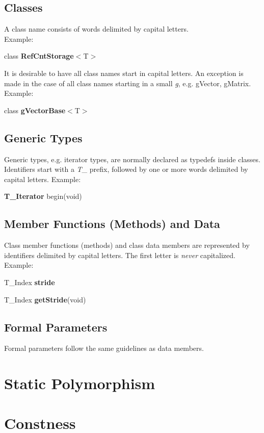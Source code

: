\documentclass[12pt,a4paper]{book}
\begin{document}
\subsection{Classes}
A class name consists of words delimited by capital letters. \\
Example:
\begin{center} 
    class \textbf{RefCntStorage}$<$T$>$ 
\end{center}
It is desirable to have all class names start in capital letters. An
exception is made in the case of all class names starting in a small {\emph
  g}, e.g. gVector, gMatrix. \\
Example:
\begin{center} 
    class \textbf{gVectorBase}$<$T$>$ 
\end{center}

\subsection{Generic Types}
Generic types, e.g. iterator types, are normally declared as typedefs inside classes.
Identifiers start with a {\emph T\_} prefix, followed by one or more words
delimited by capital letters.
Example:
\begin{center} 
    \textbf{T\_Iterator} begin(void) 
\end{center}

\subsection{Member Functions (Methods) and Data}
Class member functions (methods) and class data members are represented by identifiers delimited by
capital letters. The first letter is \emph{never} capitalized. \\
Example:
\begin{center} 
    T\_Index \textbf{stride} 
\end{center}
\begin{center} 
    T\_Index \textbf{getStride}(void) 
\end{center}

\subsection{Formal Parameters}
Formal parameters follow the same guidelines as data members.

\section{Static Polymorphism}
\label{sec:static.poly}

\section{Constness}
\end{document}
